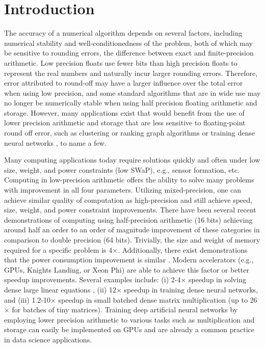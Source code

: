 \section{Introduction}
\label{sec:intro}
The accuracy of a numerical algorithm depends on several factors, including numerical stability and well-conditionedness of the problem, both of which may be sensitive to rounding errors, the difference between exact and finite-precision arithmetic. 
Low precision floats use fewer bits than high precision floats to represent the real numbers and naturally incur larger rounding errors. 
Therefore, error attributed to round-off may have a larger influence over the total error when using low precision, and some standard algorithms that are in wide use may no longer be numerically stable when using half precision floating arithmetic and storage. 
However, many applications exist that would benefit from the use of lower precision arithmetic and storage that are less sensitive to floating-point round off error, such as clustering or ranking graph algorithms \cite{vonLuxburg2007} or training dense neural networks \cite{micikevicius2018mixed}, to name a few.\par

Many computing applications today require solutions quickly and often under low size, weight, and power constraints (low SWaP), e.g., sensor formation, etc. 
Computing in low-precision arithmetic offers the ability to solve many problems with improvement in all four parameters.
Utilizing mixed-precision, one can achieve similar quality of computation as high-precision and still achieve 
speed, size, weight, and power constraint improvements. 
There have been several recent demonstrations of computing using half-precision arithmetic (16 bits) achieving around half an order to an 
order of magnitude improvement of these categories in comparison to double precision (64 bits).
Trivially, the size and weight of memory required for a specific problem is 4$\times$.
Additionally, there exist demonstrations that the power consumption improvement is similar
\cite{fagan2016powerwall}.
Modern accelerators (e.g., GPUs, Knights Landing, or Xeon Phi) are able to achieve this factor or better speedup improvements.
Several examples include:
(i)   2-4$\times$ speedup in solving dense large linear equations \cite{haidar2018iterative,haidar2019tensorcore},
(ii)  12$\times$ speedup in training dense neural networks,
and
(iii) 1.2-10$\times$ speedup in small batched dense matrix multiplication \cite{abdelfattah2019batched} (up to 26$\times$ for batches of tiny matrices).
Training deep artificial neural networks by employing lower precision arithmetic to various tasks such as multiplication \cite{Courbariaux2014Mult} and storage \cite{Courbariaux2014Storage} can easily be implemented on GPUs and are already a common practice in data science applications.\par

